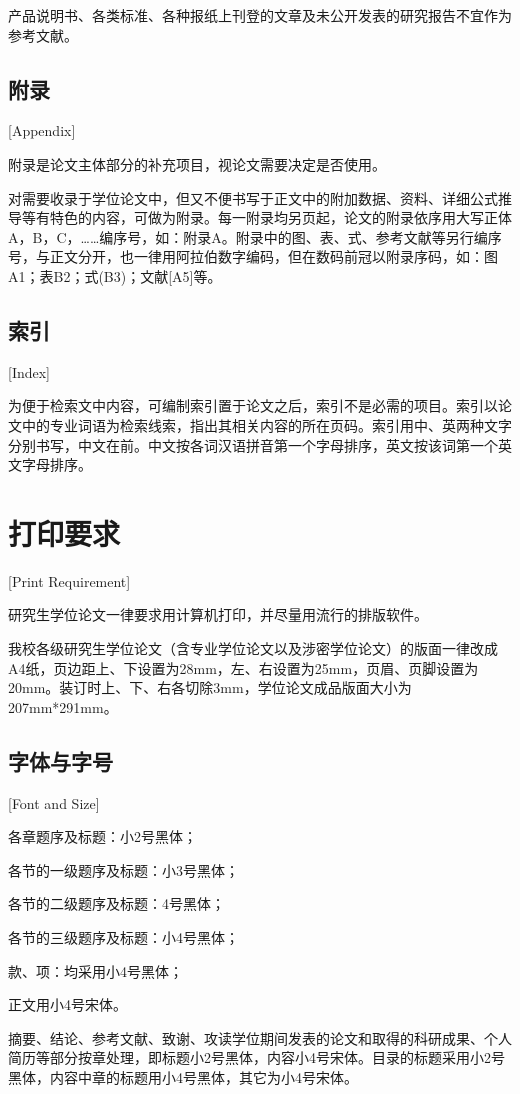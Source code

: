 产品说明书、各类标准、各种报纸上刊登的文章及未公开发表的研究报告不宜作为参考文献。

\subsection{附录}[Appendix]

附录是论文主体部分的补充项目，视论文需要决定是否使用。

对需要收录于学位论文中，但又不便书写于正文中的附加数据、资料、详细公式推导等有特色的内容，可做为附录。每一附录均另页起，论文的附录依序用大写正体A，B，C，……编序号，如：附录A。附录中的图、表、式、参考文献等另行编序号，与正文分开，也一律用阿拉伯数字编码，但在数码前冠以附录序码，如：图A1；表B2；式(B3)；文献[A5]等。

\subsection{索引}[Index]

为便于检索文中内容，可编制索引置于论文之后，索引不是必需的项目。索引以论文中的专业词语为检索线索，指出其相关内容的所在页码。索引用中、英两种文字分别书写，中文在前。中文按各词汉语拼音第一个字母排序，英文按该词第一个英文字母排序。

\section{打印要求}[Print Requirement]

研究生学位论文一律要求用计算机打印，并尽量用流行的排版软件。

我校各级研究生学位论文（含专业学位论文以及涉密学位论文）的版面一律改成A4纸，页边距上、下设置为28mm，左、右设置为25mm，页眉、页脚设置为20mm。装订时上、下、右各切除3mm，学位论文成品版面大小为207mm*291mm。

\subsection{字体与字号}[Font and Size]

各章题序及标题：小2号黑体；

各节的一级题序及标题：小3号黑体；

各节的二级题序及标题：4号黑体；

各节的三级题序及标题：小4号黑体；

款、项：均采用小4号黑体；

正文用小4号宋体。

摘要、结论、参考文献、致谢、攻读学位期间发表的论文和取得的科研成果、个人简历等部分按章处理，即标题小2号黑体，内容小4号宋体。目录的标题采用小2号黑体，内容中章的标题用小4号黑体，其它为小4号宋体。

